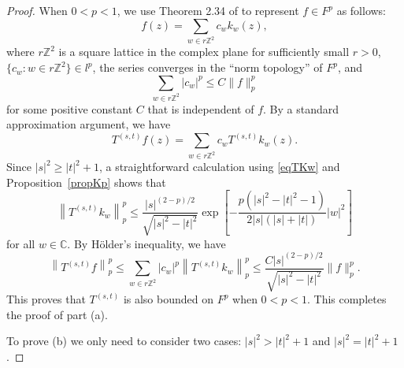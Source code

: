 \documentclass[reqno]{amsart}
\newcommand{\C}{{\mathbb C}}
\begin{document}
\begin{proof}
When $0<p<1$, we use Theorem 2.34 of \cite{Zhu1} to represent
$f\in F^p$ as follows:
$$f(z)=\sum_{w\in r\mathbb{Z}^2} c_w k_w(z),$$
where $r\mathbb{Z}^2$ is a square lattice in the complex plane for
sufficiently small $r>0$, $\{c_w : w\in r\mathbb{Z}^2\}\in l^p$,
the series converges in the ``norm topology'' of $F^p$, and
$$\sum_{w\in r\mathbb{Z}^2} |c_w|^p\leq C \|f\|_p^p$$
for some positive constant $C$ that is independent of $f$. By a
standard approximation argument, we have
$$T^{(s,t)}f(z)=\sum_{w\in r\mathbb{Z}^2} c_w T^{(s,t)}k_w(z).$$
Since $|s|^2\ge|t|^2+1$, a straightforward calculation using
\eqref{eqTKw} and Proposition~\ref{propKp} shows that
\begin{equation}\label{eqTkpless}
\left\|T^{(s,t)}k_w\right\|_p^p\leq \frac{|s|^{(2-p)/2}}{\sqrt{|s|^2-|t|^2}}
\exp\left[-\frac{p(|s|^2-|t|^2-1)}{2|s|(|s|+|t|)}|{w}|^2\right]
\end{equation}
for all $w\in\C$.
By H\"{o}lder's inequality, we have
$$\left\|T^{(s,t)}f\right\|_p^p\leq \sum_{w\in r\mathbb{Z}^2}|c_w|^p
\left\|T^{(s,t)}k_w\right\|_p^p
\leq \frac{C|s|^{(2-p)/2}}{\sqrt{|s|^2-|t|^2}}\|f\|_p^p.$$
This proves that $T^{(s,t)}$ is also bounded on $F^p$ when $0<p<1$.
This completes the proof of part (a).

To prove (b) we only need to consider two cases: $|s|^2>|t|^2+1$ and
$|s|^2=|t|^2+1$.


\end{proof}
\end{document}
